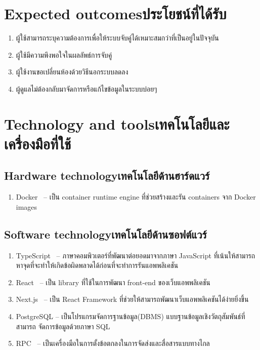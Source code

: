\section{\ifenglish Expected outcomes\else ประโยชน์ที่ได้รับ\fi}
\begin{enumerate}
    \item ผู้ใช้สามารถระบุความต้องการเพื่อให้ระบบจับคู่ได้เหมาะสมกว่าที่เป็นอยู่ในปัจจุบัน
    \item ผู้ใช้มีความพึงพอใจในผลลัพธ์การจับคู่
    \item ผู้ใช้งานขอเปลี่ยนห้องด้วยวิธีนอกระบบลดลง
    \item ผู้ดูแลไม่ต้องกลับมาจัดการหรือแก้ไขข้อมูลในระบบบ่อยๆ
\end{enumerate}

\section{\ifenglish Technology and tools\else เทคโนโลยีและเครื่องมือที่ใช้\fi}

\subsection{\ifenglish Hardware technology\else เทคโนโลยีด้านฮาร์ดแวร์\fi}
\begin{enumerate}
    \item Docker~\cite{dke} -- เป็น container runtime engine ที่ช่วยสร้างและรัน containers จาก Docker images
\end{enumerate}

\subsection{\ifenglish Software technology\else เทคโนโลยีด้านซอฟต์แวร์\fi}
\begin{enumerate}
    \item TypeScript~\cite{typescript} -- ภาษาคอมพิวเตอร์ที่พัฒนาต่อยอดมาจากภาษา JavaScript
          ที่เน้นให้สามารถหาจุดที่จะทำให้เกิดข้อผิดพลาดได้ก่อนที่จะทำการรันแอพพลิเคชัน
    \item React~\cite{react-wiki} -- เป็น library ที่ใช้ในการพัฒนา front-end ของเว็บแอพพลิเคชัน
    \item Next.js~\cite{next-wiki} -- เป็น React Framework ที่ช่วยให้สามารถพัฒนาเว็บแอพพลิเคชันได้ง่ายยิ่งขึ้น
    \item PostgreSQL -- เป็นโปรแกรมจัดการฐานข้อมูล(DBMS) แบบฐานข้อมูลเชิงวัตถุสัมพันธ์ที่สามารถ จัดการข้อมูลด้วยภาษา SQL
    \item RPC~\cite{RPC-wiki} -- เป็นเครื่องมือในการตั้งข้อตกลงในการจัดส่งและสื่อสารแบบทางไกล
\end{enumerate}


